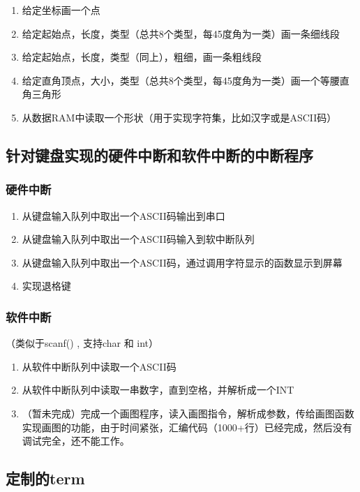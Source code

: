 \begin{enumerate}
    \item 给定坐标画一个点
    \item 给定起始点，长度，类型（总共8个类型，每45度角为一类）画一条细线段
    \item 给定起始点，长度，类型（同上），粗细，画一条粗线段
    \item 给定直角顶点，大小，类型（总共8个类型，每45度角为一类）画一个等腰直角三角形
    \item 从数据RAM中读取一个形状（用于实现字符集，比如汉字或是ASCII码）
\end{enumerate}




\subsection{针对键盘实现的硬件中断和软件中断的中断程序}

\subsubsection{硬件中断}

\begin{enumerate}
    \item 从键盘输入队列中取出一个ASCII码输出到串口
    \item 从键盘输入队列中取出一个ASCII码输入到软中断队列
    \item 从键盘输入队列中取出一个ASCII码，通过调用字符显示的函数显示到屏幕
    \item 实现退格键
\end{enumerate}

\subsubsection{软件中断}

（类似于scanf()  ,  支持char 和 int）
\begin{enumerate}
    \item 从软件中断队列中读取一个ASCII码
    \item 从软件中断队列中读取一串数字，直到空格，并解析成一个INT
    \item （暂未完成）完成一个画图程序，读入画图指令，解析成参数，传给画图函数实现画图的功能，由于时间紧张，汇编代码（1000+行）已经完成，然后没有调试完全，还不能工作。
\end{enumerate}

\subsection{定制的term}

